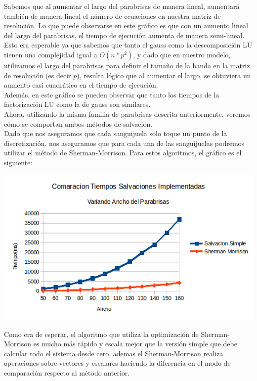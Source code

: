 Sabemos que al aumentar el largo del parabrisas de manera lineal, aumentará también de manera lineal el número de ecuaciones en nuestra matriz de resolución. Lo que puede observarse en este gráfico es que con un aumento lineal del largo del parabrisas, el tiempo de ejecución aumenta de manera semi-lineal. Esto era esperable ya que sabemos que tanto el gauss como la descomposición LU tienen una complejidad igual a $O(n*p^2)$, y dado que en nuestro modelo, utilizamos el largo del parabrisas para definir el tamaño de la banda en la matriz de resolución (es decir $p$), resulta lógico que al aumentar el largo, se obtuviera un aumento casi cuadrático en el tiempo de ejecución.
\\
Además, en este gráfico se pueden observar que tanto los tiempos de la factorización LU como la de gauss son similares.
\\
Ahora, utilizando la misma familia de parabrisas descrita anteriormente, veremos cómo se comportan ambos métodos de salvación.
\\
Dado que nos aseguramos que cada sanguijuela solo toque un punto de la discretización, nos aseguramos que para cada una de las sanguijuelas podremos utilizar el método de Sherman-Morrison. Para estos algoritmos, el gráfico es el siguiente:
\\
\begin{center}
 \includegraphics[width=400pt]{imagenes/testeo/anchoSalv.png}
\end{center}

Como era de esperar, el algoritmo que utiliza la optimización de Sherman-Morrison es mucho más rápido y escala mejor que la versión simple que debe calcular todo el sistema desde cero, ademas el Sherman-Morrison realiza operaciones sobre vectores y escalares haciendo la diferencia en el modo de comparación respecto al método anterior.

